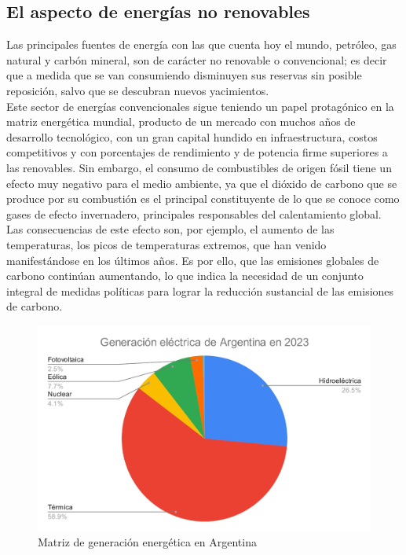 \subsection{El aspecto de energías no renovables}

Las principales fuentes de energía con las que cuenta hoy el mundo, petróleo, gas natural y carbón mineral, son de carácter no renovable o convencional; es decir que a medida que se van consumiendo disminuyen sus reservas sin posible reposición, salvo que se descubran nuevos yacimientos.\\

Este sector de energías convencionales sigue teniendo un papel protagónico en la matriz energética mundial, producto de un mercado con muchos años de desarrollo tecnológico, con un gran capital hundido en infraestructura, costos competitivos y con porcentajes de rendimiento y de potencia firme superiores a las renovables. Sin embargo, el consumo de combustibles de origen fósil tiene un efecto muy negativo para el medio ambiente, ya que el dióxido de carbono que se produce por su combustión es el principal constituyente de lo que se conoce como gases de efecto invernadero, principales responsables del calentamiento global.\\

Las consecuencias de este efecto son, por ejemplo, el aumento de las temperaturas, los picos de temperaturas extremos, que han venido manifestándose en los últimos años. Es por ello, que las emisiones globales de carbono continúan aumentando, lo que indica la necesidad de un conjunto integral de medidas políticas para lograr la reducción sustancial de las emisiones de carbono.\\

\begin{figure}[H]
    \centering
    \includegraphics[width=0.85\linewidth]{ambiente/Screenshot_20.jpg}
    \caption{Matriz de generación energética en Argentina}
    \label{fig:matriz-energias}
\end{figure}

